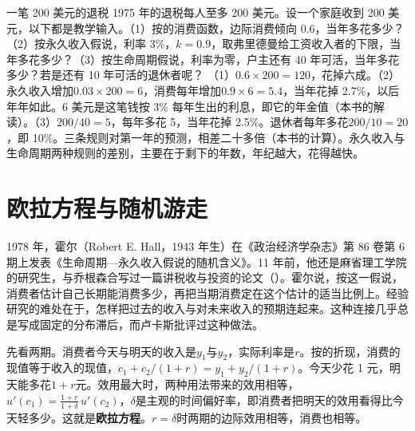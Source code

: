 \begin{example}{一笔 200 美元的退税}\label{ex:consumption-windfall}
1975 年的退税每人至多 200 美元\cite{pl9412}。设一个家庭收到 200 美元，以下都是教学输入。（1）按的消费函数，边际消费倾向 0.6，当年多花多少？（2）按永久收入假说，利率 3\%，$k=0.9$，取弗里德曼给工资收入者的下限，当年多花多少？（3）按生命周期假说，利率为零，户主还有 40 年可活，当年多花多少？若是还有 10 年可活的退休者呢？
\solution
（1）$0.6\times200=120$，花掉六成。（2）永久收入增加$0.03\times200=6$，消费每年增加$0.9\times6=5.4$，当年花掉 2.7\%，以后年年如此。6 美元是这笔钱按 3\% 每年生出的利息，即它的年金值（本书的解读）。（3）$200/40=5$，每年多花 5，当年花掉 2.5\%。退休者每年多花$200/10=20$，即 10\%。三条规则对第一年的预测，相差二十多倍（本书的计算）。永久收入与生命周期两种规则的差别，主要在于剩下的年数，年纪越大，花得越快。
\end{example}


\section{欧拉方程与随机游走}\label{sec:consumption-euler}

1978 年，霍尔（Robert E. Hall，1943 年生）在《政治经济学杂志》第 86 卷第 6 期上发表《生命周期—永久收入假说的随机含义》\cite{hall1978,loc39}。11 年前，他还是麻省理工学院的研究生，与乔根森合写过一篇讲税收与投资的论文（）\cite{hj1967}。霍尔说，按这一假说，消费者估计自己长期能消费多少，再把当期消费定在这个估计的适当比例上\cite{hall1978}。经验研究的难处在于，怎样把过去的收入与对未来收入的预期连起来\cite{hall1978}。这种连接几乎总是写成固定的分布滞后，而卢卡斯批评过这种做法\cite{hall1978}。

先看两期。消费者今天与明天的收入是$y_1$与$y_2$，实际利率是$r$。按的折现，消费的现值等于收入的现值，$c_1+c_2/(1+r)=y_1+y_2/(1+r)$。今天少花 1 元，明天能多花$1+r$元。效用最大时，两种用法带来的效用相等，$u'(c_1)=\frac{1+r}{1+\delta}\,u'(c_2)$，$\delta$是主观的时间偏好率，即消费者把明天的效用看得比今天轻多少。这就是\textbf{欧拉方程}。$r=\delta$时两期的边际效用相等，消费也相等。

